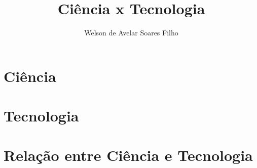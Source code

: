 \documentclass[11pt]{beamer}
\title{Ciência x Tecnologia}
\subtitle{}
\author{Welson de Avelar Soares Filho}
\begin{document}


%

\section{Ciência}


\section{Tecnologia}


\section{Relação entre Ciência e Tecnologia}


%

%

%

%



%
%


\begin{frame}
\titlepage 
\end{frame}
\end{document}
